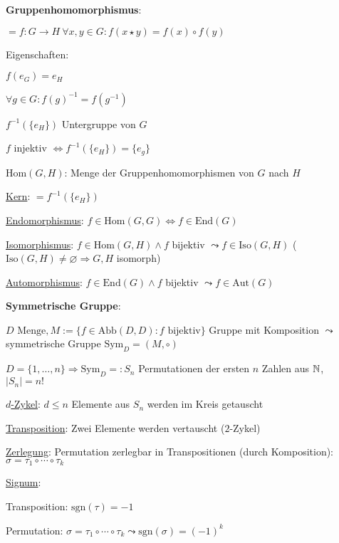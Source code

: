   \textbf{Gruppenhomomorphismus}:
  \begin{items}
    \item $=f:G \rightarrow H \ \forall x,y \in G: f(x \star y) = f(x) \circ f(y)$
    \item Eigenschaften:
    \begin{enumeration}
      \item $f(e_G) = e_H$
      \item $\forall g \in G: f(g)^{-1} = f(g^{-1})$
      \item $f^{-1}(\{ e_H \} )$ Untergruppe von $G$
      \item $f$ injektiv $\Leftrightarrow f^{-1}(\{ e_H \} ) = \{ e_g \}$
    \end{enumeration}
    \item \underline{$\text{Hom}(G,H)$}: Menge der Gruppenhomomorphismen von $G$ nach $H$
    \item \underline{Kern}: $=f^{-1}(\{ e_H \})$
    \item \underline{Endomorphismus}: $f \in \text{Hom}(G,G) \Leftrightarrow f \in \text{End}(G)$
    \item \underline{Isomorphismus}: $f \in \text{Hom}(G,H) \wedge f$ bijektiv $\leadsto f \in \text{Iso}(G,H)$ ($\text{Iso}(G,H) \neq \varnothing \Rightarrow G,H$ isomorph)
    \item \underline{Automorphismus}: $f \in \text{End}(G) \wedge f$ bijektiv $\leadsto f \in \text{Aut}(G)$
  \end{items}

  \textbf{Symmetrische Gruppe}:
  \begin{items}
    \item $D \text{ Menge}, M := \{ f \in \text{Abb}(D,D): f \text{ bijektiv} \}$ Gruppe mit Komposition $\leadsto$ symmetrische Gruppe $\text{Sym}_D = (M, \circ)$
    \item $D=\{ 1,\dots ,n \} \Rightarrow \text{Sym}_D =: S_n$ Permutationen der ersten $n$ Zahlen aus $\mathbb{N}$, $|S_n|=n!$
    \item \underline{$d$-Zykel}: $d \leq n$ Elemente aus $S_n$ werden im Kreis getauscht
    \item \underline{Transposition}: Zwei Elemente werden vertauscht ($2$-Zykel)
    \item \underline{Zerlegung}: Permutation zerlegbar in Transpositionen (durch Komposition): $\sigma = \tau_1 \circ \cdots \circ \tau_k$
    \item \underline{Signum}:
    \begin{enumeration}
      \item Transposition: $\text{sgn}(\tau)=-1$
      \item Permutation: $\sigma = \tau_1 \circ \cdots \circ \tau_k \leadsto \text{sgn}(\sigma)={(-1)}^{k}$
    \end{enumeration}
  \end{items}